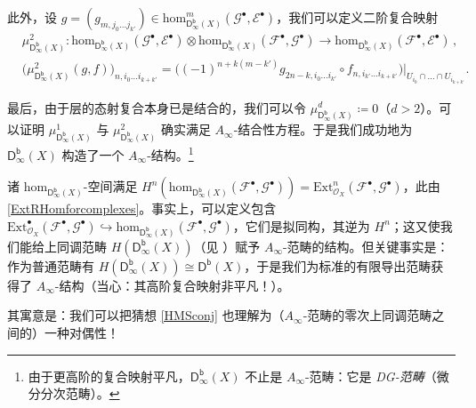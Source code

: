 \begin{Rem}
	此外，设 $g=(g_{m,j_0...j_{k'}})\in\text{hom}_{\mathsf{D^b_\infty}\!(X)}^{m}(\mathcal{G}^\bullet,\mathcal{E}^\bullet)$，我们可以定义二阶复合映射
	\begin{align*}
		&\mu_{\mathsf{D^b_\infty}\!(X)}^2:\text{hom}_{\mathsf{D^b_\infty}\!(X)}(\mathcal{G}^\bullet,\mathcal{E}^\bullet)\otimes\text{hom}_{\mathsf{D^b_\infty}\!(X)}(\mathcal{F}^\bullet,\mathcal{G}^\bullet)\rightarrow\text{hom}_{\mathsf{D^b_\infty}\!(X)}(\mathcal{F}^\bullet,\mathcal{E}^\bullet)\,, \\
		&\big(\mu_{\mathsf{D^b_\infty}\!(X)}^2(g,f)\big)_{n,i_0...i_{k+k'}}\!\!=\!\big((-1)^{n\!+\!k(m\!-\!k')}g_{2n-k,i_0...i_{k'}}\!\circ\! f_{n,i_{k'}...i_{k+k'}}\big)|_{U_{i_0}\cap...\cap U_{i_{k+k'}}}.
	\end{align*}

	最后，由于层的态射复合本身已是结合的，我们可以令 $\mu_{\mathsf{D^b_\infty}\!(X)}^d\coloneqq 0$（$d>2$）。可以证明 $\mu_{\mathsf{D^b_\infty}\!(X)}^1$ 与 $\mu_{\mathsf{D^b_\infty}\!(X)}^2$ 确实满足 $A_\infty$-结合性方程。于是我们成功地为 $\mathsf{D^b_\infty}(X)$ 构造了一个 $A_\infty$-结构。\footnote{由于更高阶的复合映射平凡，$\mathsf{D^b_\infty}(X)$ 不止是 $A_\infty$-范畴：它是 \textit{DG-范畴}（微分分次范畴）。}

	诸 $\text{hom}_{\mathsf{D^b_\infty}\!(X)}$-空间满足 $H^n(\text{hom}_{\mathsf{D^b_\infty}\!(X)}(\mathcal{F}^\bullet,\mathcal{G}^\bullet))\!=\!\text{Ext}_{\mathcal{O}_X}^n(\mathcal{F}^\bullet,\mathcal{G}^\bullet)$，此由 \eqref{ExtRHomforcomplexes}。事实上，可以定义包含 $\text{Ext}_{\mathcal{O}_X}^\bullet(\mathcal{F}^\bullet,\mathcal{G}^\bullet)\hookrightarrow \text{hom}_{\mathsf{D^b_\infty}\!(X)}(\mathcal{F}^\bullet,\mathcal{G}^\bullet)$，它们是拟同构，其逆为 $H^n$；这又使我们能给上同调范畴 $H(\mathsf{D^b_\infty}(X))$（见 \cite[定义 2.6]{[Imp21]}）赋予 $A_\infty$-范畴的结构。但关键事实是：作为普通范畴有 $H(\mathsf{D^b_\infty}(X))\cong\mathsf{D^b}(X)$，于是我们为标准的有限导出范畴获得了 $A_\infty$-结构（当心：其高阶复合映射非平凡！）。

	其寓意是：我们可以把猜想 \ref{HMSconj} 也理解为（$A_\infty$-范畴的零次上同调范畴之间的）一种对偶性！
\end{Rem}


